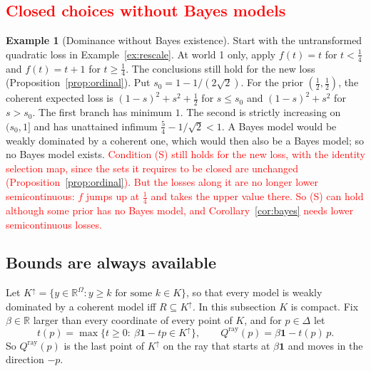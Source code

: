 \documentclass[11pt]{article}
\theoremstyle{definition}
\newtheorem{example}[theorem]{Example}
\theoremstyle{remark}
\newcommand{\R}{\mathbb R}
\newcommand{\one}{\mathbf 1}
\begin{document}
\subsection{\textcolor{red}{Closed choices without Bayes models}}
\begin{example}[Dominance without Bayes existence]\label{ex:discontinuous}
Start with the untransformed quadratic loss in Example~\ref{ex:rescale}.  At world 1 only, apply $f(t)=t$ for $t<\tfrac14$ and $f(t)=t+1$ for $t\ge\tfrac14$. The conclusions still hold for the new loss (Proposition~\ref{prop:ordinal}). Put $s_0=1-1/(2\sqrt2)$. For the prior $(\tfrac12,\tfrac12)$, the coherent expected loss is $(1-s)^2+s^2+\tfrac12$ for $s\le s_0$ and $(1-s)^2+s^2$ for $s>s_0$. The first branch has minimum $1$. The second is strictly increasing on $(s_0,1]$ and has unattained infimum $\tfrac54-1/\sqrt2<1$. A Bayes model would be weakly dominated by a coherent one, which would then also be a Bayes model; so no Bayes model exists. \textcolor{red}{Condition (S) still holds for the new loss, with the identity selection map, since the sets it requires to be closed are unchanged (Proposition~\ref{prop:ordinal}). But the losses along it are no longer lower semicontinuous: $f$ jumps up at $\tfrac14$ and takes the upper value there. So (S) can hold although some prior has no Bayes model, and Corollary~\ref{cor:bayes} needs lower semicontinuous losses.}
\end{example}

\subsection{Bounds are always available}\label{sec:necessary}
Let $K^\uparrow=\{y\in\R^\Omega:y\ge k\text{ for some }k\in K\}$, so that every model is weakly dominated by a coherent model iff $R\subseteq K^\uparrow$. In this subsection $K$ is compact. Fix $\beta\in\R$ larger than every coordinate of every point of $K$, and for $p\in\Delta$ let
\[
 t(p)=\max\{t\ge0:\ \beta\one-tp\in K^\uparrow\},\qquad Q^{\mathrm{ray}}(p)=\beta\one-t(p)\,p.
\]
So $Q^{\mathrm{ray}}(p)$ is the last point of $K^\uparrow$ on the ray that starts at $\beta\one$ and moves in the direction $-p$.
\end{document}
